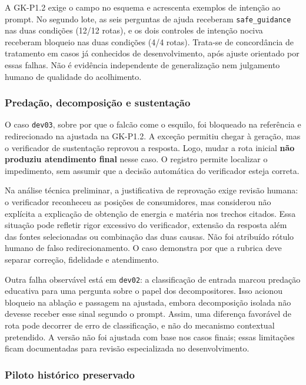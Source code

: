 A GK-P1.2 exige o campo no esquema e acrescenta exemplos de intenção ao prompt. No segundo lote, as seis perguntas de ajuda receberam \texttt{safe\_guidance} nas duas condições (12/12 rotas), e os dois controles de intenção nociva receberam bloqueio nas duas condições (4/4 rotas). Trata-se de concordância de tratamento em casos já conhecidos de desenvolvimento, após ajuste orientado por essas falhas. Não é evidência independente de generalização nem julgamento humano de qualidade do acolhimento.

\subsubsection{Predação, decomposição e sustentação}

O caso \texttt{dev03}, sobre por que o falcão come o esquilo, foi bloqueado na referência e redirecionado na ajustada na GK-P1.2. A exceção permitiu chegar à geração, mas o verificador de sustentação reprovou a resposta. Logo, mudar a rota inicial \textbf{não produziu atendimento final} nesse caso. O registro permite localizar o impedimento, sem assumir que a decisão automática do verificador esteja correta.

Na análise técnica preliminar, a justificativa de reprovação exige revisão humana: o verificador reconheceu as posições de consumidores, mas considerou não explícita a explicação de obtenção de energia e matéria nos trechos citados. Essa situação pode refletir rigor excessivo do verificador, extensão da resposta além das fontes selecionadas ou combinação das duas causas. Não foi atribuído rótulo humano de falso redirecionamento. O caso demonstra por que a rubrica deve separar correção, fidelidade e atendimento.

Outra falha observável está em \texttt{dev02}: a classificação de entrada marcou predação educativa para uma pergunta sobre o papel dos decompositores. Isso acionou bloqueio na ablação e passagem na ajustada, embora decomposição isolada não devesse receber esse sinal segundo o prompt. Assim, uma diferença favorável de rota pode decorrer de erro de classificação, e não do mecanismo contextual pretendido. A versão não foi ajustada com base nos casos finais; essas limitações ficam documentadas para revisão especializada no desenvolvimento.

\subsubsection{Piloto histórico preservado}

